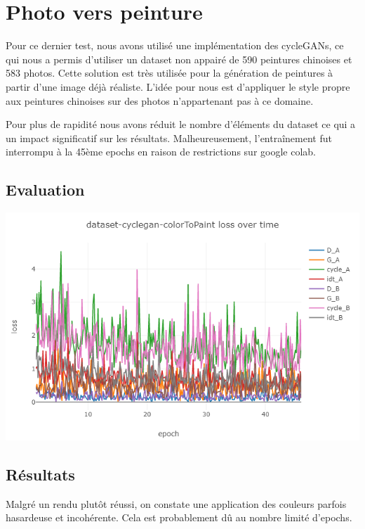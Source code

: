 \documentclass[a4paper, 12pt]{report}
\begin{document}
\pagebreak

\section{Photo vers peinture}

Pour ce dernier test, nous avons utilisé une implémentation des cycleGANs, ce qui nous a permis d'utiliser un dataset non appairé de 590 peintures chinoises et 583 photos. Cette solution est très utilisée pour la génération de peintures à partir d'une image déjà réaliste. L'idée pour nous est d'appliquer le style propre aux peintures chinoises sur des photos n'appartenant pas à ce domaine. 

Pour plus de rapidité nous avons réduit le nombre d'éléments du dataset ce qui a un impact significatif sur les résultats. Malheureusement, l'entraînement fut interrompu à la 45ème epochs en raison de restrictions sur google colab.

\subsection{Evaluation}
\begin{center}
  \centering
    \includegraphics[width=0.9\linewidth]{images/plot-cyclegan.png}
\end{center}


\subsection{Résultats}
Malgré un rendu plutôt réussi, on constate une application des couleurs parfois hasardeuse et incohérente. Cela est probablement dû au nombre limité d'epochs.
\end{document}
